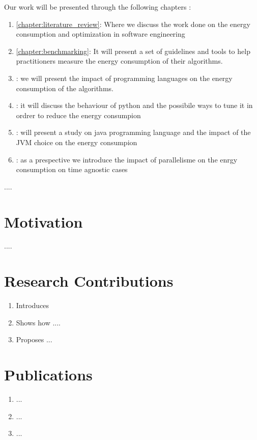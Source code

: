 Our work will be presented through the following chapters :

\begin{enumerate}
    \item \ref{chapter:literature_review}: Where we discuss the work done on the energy consumption and optimization in software engineering
    \item \ref{chapter:benchmarking}: It will present a set of guidelines and tools to help practitioners measure the energy consumption of their algorithms.
    \item : we will present the impact of programming languages on the energy consumption of the algorithms.
    \item : it will discuss the behaviour of python and the possibile ways to tune it in ordrer to reduce the energy consumpion
    \item : will present a study on java programming language and the impact of the JVM choice on the energy consumpion
    \item : as a prespective we introduce the impact of parallelisme on the enrgy consumption on time agnostic cases
\end{enumerate}




....


\section{Motivation}
....


\section{Research Contributions}


\begin{enumerate}

    \item Introduces
    \item Shows how ....
    \item Proposes ...

\end{enumerate}



\section{Publications}

\begin{enumerate}
    \item ...

    \item ...

    \item ...

\end{enumerate}
\cleardoublepage
